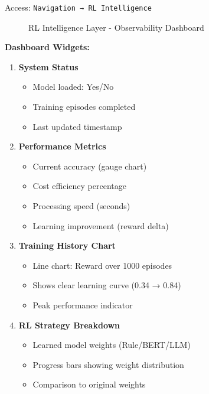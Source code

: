Access: \texttt{Navigation → RL Intelligence}

\begin{figure}[h]
\centering
{}
\caption{RL Intelligence Layer - Observability Dashboard}
\label{fig:rl-dashboard}
\end{figure}

\textbf{Dashboard Widgets:}
\begin{enumerate}
    \item \textbf{System Status}
    \begin{itemize}
        \item Model loaded: Yes/No
        \item Training episodes completed
        \item Last updated timestamp
    \end{itemize}
    
    \item \textbf{Performance Metrics}
    \begin{itemize}
        \item Current accuracy (gauge chart)
        \item Cost efficiency percentage
        \item Processing speed (seconds)
        \item Learning improvement (reward delta)
    \end{itemize}
    
    \item \textbf{Training History Chart}
    \begin{itemize}
        \item Line chart: Reward over 1000 episodes
        \item Shows clear learning curve (0.34 → 0.84)
        \item Peak performance indicator
    \end{itemize}
    
    \item \textbf{RL Strategy Breakdown}
    \begin{itemize}
        \item Learned model weights (Rule/BERT/LLM)
        \item Progress bars showing weight distribution
        \item Comparison to original weights
    \end{itemize}
\end{enumerate}

